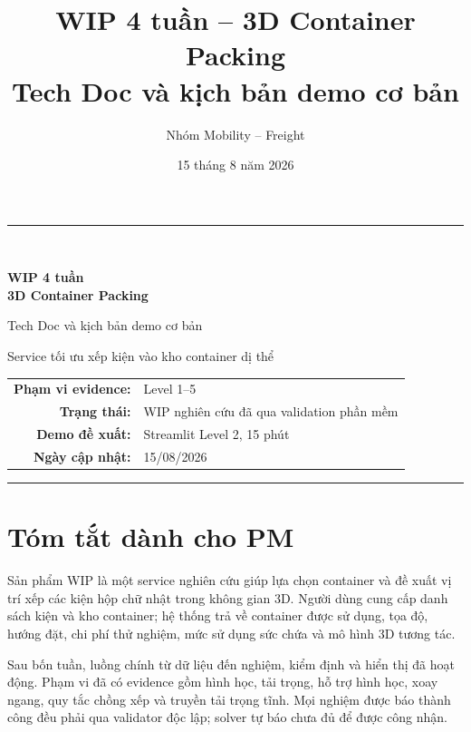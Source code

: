 \documentclass[12pt,a4paper]{article}
\title{\textbf{WIP 4 tuần -- 3D Container Packing}\\[0.5em]
       \large Tech Doc và kịch bản demo cơ bản}
\author{Nhóm Mobility -- Freight}
\date{15 tháng 8 năm 2026}
\newcommand{\code}[1]{\texttt{\detokenize{#1}}}
\begin{document}
\begin{titlepage}
  \centering
  \vspace*{2.2cm}
  {\color{brandblue}\rule{\textwidth}{1.2pt}}\\[1.2cm]
  {\Huge\bfseries WIP 4 tuần\\[0.4em]3D Container Packing\par}
  \vspace{0.8cm}
  {\Large Tech Doc và kịch bản demo cơ bản\par}
  \vspace{1.2cm}
  {\large Service tối ưu xếp kiện vào kho container dị thể\par}
  \vfill
  \begin{tabular}{rl}
    \textbf{Phạm vi evidence:} & Level 1--5 \\
    \textbf{Trạng thái:} & WIP nghiên cứu đã qua validation phần mềm \\
    \textbf{Demo đề xuất:} & Streamlit Level 2, 15 phút \\
    \textbf{Ngày cập nhật:} & 15/08/2026
  \end{tabular}
  \vfill
  {\color{brandblue}\rule{\textwidth}{1.2pt}}
\end{titlepage}

\tableofcontents
\clearpage
{}

\section*{Tóm tắt dành cho PM}

Sản phẩm WIP là một service nghiên cứu giúp lựa chọn container và đề xuất vị trí xếp các
kiện hộp chữ nhật trong không gian 3D. Người dùng cung cấp danh sách kiện và kho container;
hệ thống trả về container được sử dụng, tọa độ, hướng đặt, chi phí thử nghiệm, mức sử dụng
sức chứa và mô hình 3D tương tác.

Sau bốn tuần, luồng chính từ dữ liệu đến nghiệm, kiểm định và hiển thị đã hoạt động. Phạm
vi đã có evidence gồm hình học, tải trọng, hỗ trợ hình học, xoay ngang, quy tắc chồng xếp
và truyền tải trọng tĩnh. Mọi nghiệm được báo thành công đều phải qua validator độc lập;
solver tự báo \code{FEASIBLE} chưa đủ để được công nhận.

\begin{center}
\end{center}
\end{document}
